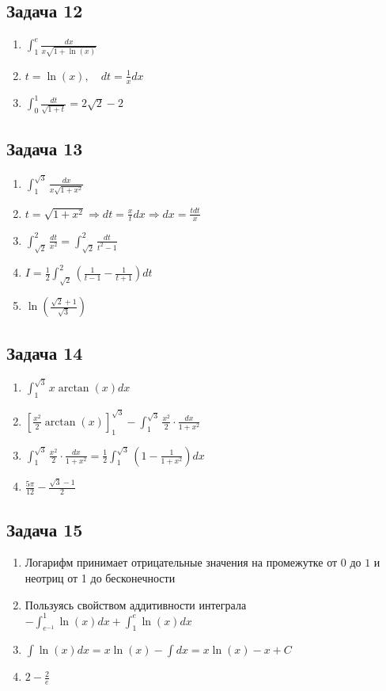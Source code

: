 \documentclass[a4paper,12pt]{article}
\begin{document}
\subsection{Задача 12}
\begin{enumerate}
    \item $\int_{1}^{e} \frac{dx}{x\sqrt{1+\ln(x)}}$
    \item $t = \ln(x), \quad dt = \frac{1}{x}dx$
    \item $\int_{0}^{1} \frac{dt}{\sqrt{1+t}} = 2\sqrt{2}-2$
\end{enumerate}

\subsection{Задача 13}
\begin{enumerate}
    \item $\int_{1}^{\sqrt{3}} \frac{dx}{x\sqrt{1+x^2}}$
    \item $t = \sqrt{1+x^2} \Rightarrow dt = \frac{x}{t}dx \Rightarrow dx = \frac{tdt}{x}$
    \item $\int_{\sqrt{2}}^{2} \frac{dt}{x^2} = \int_{\sqrt{2}}^{2} \frac{dt}{t^2-1}$
    \item $I=\frac{1}{2}\int_{\sqrt{2}}^{2}\left(\frac{1}{t-1}-\frac{1}{t+1}\right)dt$
    \item $\ln\left(\frac{\sqrt{2}+1}{\sqrt{3}}\right)$
\end{enumerate}

\subsection{Задача 14}
\begin{enumerate}
    \item $\int_{1}^{\sqrt{3}} x \arctan(x) dx$
    \item $\left[\frac{x^2}{2}\arctan(x)\right]_{1}^{\sqrt{3}} - \int_{1}^{\sqrt{3}} \frac{x^2}{2}\cdot \frac{dx}{1+x^2}$
    \item $\int_{1}^{\sqrt{3}} \frac{x^2}{2}\cdot \frac{dx}{1+x^2} = \frac{1}{2}\int_{1}^{\sqrt{3}} \left(1 - \frac{1}{1+x^2}\right) dx$
    \item $\frac{5\pi}{12} - \frac{\sqrt{3} - 1}{2}$
\end{enumerate}

\subsection{Задача 15}
\begin{enumerate}
    \item Логарифм принимает отрицательные значения на промежутке от $0$ до $1$ и неотриц от 1 до бесконечности
    \item Пользуясь свойством аддитивности интеграла $-\int_{e^{-1}}^{1}\ln(x)dx + \int_{1}^{e}\ln(x)dx$
    \item $\int \ln(x)dx = x\ln(x) - \int dx = x\ln(x) - x + C$
    \item $2-\frac{2}{e}$
\end{enumerate}
\end{document}
